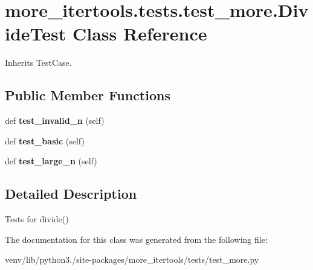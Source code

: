 \hypertarget{classmore__itertools_1_1tests_1_1test__more_1_1_divide_test}{}\section{more\+\_\+itertools.\+tests.\+test\+\_\+more.\+Divide\+Test Class Reference}
\label{classmore__itertools_1_1tests_1_1test__more_1_1_divide_test}


Inherits Test\+Case.

\subsection*{Public Member Functions}
\begin{DoxyCompactItemize}
\item 
\mbox{\label{classmore__itertools_1_1tests_1_1test__more_1_1_divide_test_acd1d7288006b85c1bbc47909c9ed481f}} 
def {\bfseries test\+\_\+invalid\+\_\+n} (self)
\item 
\mbox{\label{classmore__itertools_1_1tests_1_1test__more_1_1_divide_test_acec5e0d4c16ed0de202943489601db4e}} 
def {\bfseries test\+\_\+basic} (self)
\item 
\mbox{\label{classmore__itertools_1_1tests_1_1test__more_1_1_divide_test_acbc9fc30794aaaf14ad716456120dcdd}} 
def {\bfseries test\+\_\+large\+\_\+n} (self)
\end{DoxyCompactItemize}


\subsection{Detailed Description}
\begin{DoxyVerb}Tests for divide()\end{DoxyVerb}
 

The documentation for this class was generated from the following file\+:\begin{DoxyCompactItemize}
\item 
venv/lib/python3./site-\/packages/more\+\_\+itertools/tests/test\+\_\+more.\+py\end{DoxyCompactItemize}
